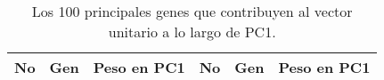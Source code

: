 
\chapter{}\label{apx:apx3}

\begin{table}[!htb]
	\centering
	\caption{Los 100 principales genes que contribuyen al vector unitario a lo largo de PC1.}
	\label{tab:apx3}
	\begin{tabular}{|r|c|c||r|c|c|}
		\hline
		No & Gen & Peso en PC1 & No & Gen & Peso en PC1 \\ \hline
	\end{tabular}
\end{table}
